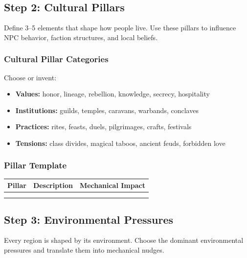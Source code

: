 \documentclass[11pt]{article}
\begin{document}
\subsection{Step 2: Cultural Pillars}
Define 3--5 elements that shape how people live. Use these pillars to influence NPC behavior, 
faction structures, and local beliefs.

\subsubsection{Cultural Pillar Categories}
Choose or invent:

\begin{itemize}
    \item \textbf{Values:} honor, lineage, rebellion, knowledge, secrecy, hospitality
    \item \textbf{Institutions:} guilds, temples, caravans, warbands, conclaves
    \item \textbf{Practices:} rites, feasts, duels, pilgrimages, crafts, festivals
    \item \textbf{Tensions:} class divides, magical taboos, ancient feuds, forbidden love
\end{itemize}

\subsubsection{Pillar Template}
\begin{center}
\begin{longtable}{|p{3cm}|p{6cm}|p{4cm}|}
\hline
\textbf{Pillar} & \textbf{Description} & \textbf{Mechanical Impact} \\
\hline
\phantom{Pillar} & & \\
\phantom{Pillar} & & \\
\hline
\end{longtable}
\end{center}

\subsection{Step 3: Environmental Pressures}

Every region is shaped by its environment. Choose the dominant environmental pressures and 
translate them into mechanical nudges.
\end{document}

